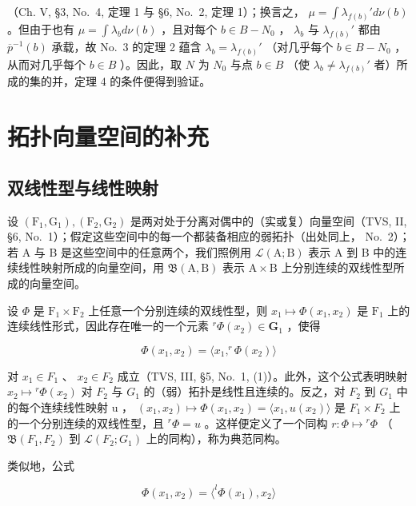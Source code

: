 （Ch. V, §3, No.~4, 定理 1 与 §6, No.~2, 定理 1）；换言之， \(\mu = \int \lambda_{f(b)}' d\nu(b)\) 。但由于也有 \(\mu = \int \lambda_b d\nu(b)\) ，且对每个 \(b \in B - N_0\) ， \(\lambda_b\) 与 \(\lambda_{f(b)}'\) 都由 \(\overline{p}^{-1}(b)\) 承载，故 No.~3 的定理 2 蕴含 \(\lambda_b = \lambda_{f(b)}'\) （对几乎每个 \(b \in B - N_0\) ，从而对几乎每个 \(b \in B\) ）。因此，取 \(N\) 为 \(N_0\) 与点 \(b \in B\) （使 \(\lambda_b \neq \lambda_{f(b)}'\) 者）所成的集的并，定理 4 的条件便得到验证。

\appendix
\chapter{拓扑向量空间的补充}

\section{双线性型与线性映射}

设 \((\mathrm{F}_{1},\mathrm{G}_{1}),(\mathrm{F}_{2},\mathrm{G}_{2})\) 是两对处于分离对偶中的（实或复）向量空间（TVS, II, §6, No.~1）；假定这些空间中的每一个都装备相应的弱拓扑（出处同上， No.~2）；若 A 与 B 是这些空间中的任意两个，我们照例用 \(\mathcal{L}(\mathrm{A};\mathrm{B})\) 表示 A 到 B 中的连续线性映射所成的向量空间，用 \(\mathfrak{B}(\mathrm{A},\mathrm{B})\) 表示 \(\mathrm{A}\times \mathrm{B}\) 上分别连续的双线性型所成的向量空间。

设 \(\Phi\) 是 \(\mathrm{F}_1\times \mathrm{F}_2\) 上任意一个分别连续的双线性型，则 \(x_{1}\mapsto \Phi (x_{1},x_{2})\) 是 \(\mathrm{F}_1\) 上的连续线性形式，因此存在唯一的一个元素 \(^r\Phi (x_2)\in \mathbf{G}_1\) ，使得

\[
\Phi (x _ {1}, x _ {2}) = \langle x _ {1}, ^ {r} \Phi (x _ {2}) \rangle\tag{1}
\]

对 \(x_{1} \in F_{1}\) 、 \(x_{2} \in F_{2}\) 成立（TVS, III, §5, No.~1, (1)）。此外，这个公式表明映射 \(x_{2} \mapsto {}^{r}\Phi(x_{2})\) 对 \(F_{2}\) 与 \(G_{1}\) 的（弱）拓扑是线性且连续的。反之，对 \(F_{2}\) 到 \(G_{1}\) 中的每个连续线性映射 u ， \((x_{1}, x_{2}) \mapsto \Phi(x_{1}, x_{2}) = \langle x_{1}, u(x_{2}) \rangle\) 是 \(F_{1} \times F_{2}\) 上的一个分别连续的双线性型，且 \(^{r}\Phi = u\) 。这样便定义了一个同构 \(r : \Phi \mapsto {}^{r}\Phi\) （ \(\mathfrak{B}(F_{1}, F_{2})\) 到 \(\mathcal{L}(F_{2}; G_{1})\) 上的同构），称为典范同构。

类似地，公式

\[
\Phi (x _ {1}, x _ {2}) = \langle^ {l} \Phi (x _ {1}), x _ {2} \rangle\tag{2}
\]

